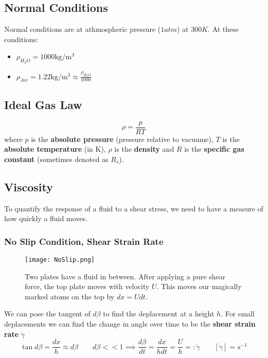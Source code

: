 \subsection{Normal Conditions}
Normal conditions are at athmospheric pressure ($1atm$) at $300K$. At these conditions:
\begin{itemize}
    \item $\rho_{H_2O} = 1000 \mathrm{kg/m^3}$
    \item $\rho_{Air} = 1.22 \mathrm{kg/m^3} \approx \frac{\rho_{H_2O}}{1000}$
\end{itemize}

\subsection{Ideal Gas Law}
$$
\rho = \frac{p}{RT}
$$
where $p$ is the \textbf{absolute pressure} (pressure relative to vacuume), $T$ is the \textbf{absolute temperature} (in $\mathrm{K}$), $\rho$ is the \textbf{density} and $R$ is the \textbf{specific gas constant} (sometimes denoted as $R_s$).

\subsection{Viscosity}
To quantify the response of a fluid to a shear stress, we need to have a measure of how quickly a fluid moves.

\subsubsection{No Slip Condition, Shear Strain Rate}
\begin{center}
\end{center}
\begin{figure}[H]
    \begin{center}
    \texttt{[image: NoSlip.png]}
    \caption{Two plates have a fluid in between. After applying a pure shear force, the top plate moves with velocity $U$. This moves our magically marked atoms on the top by $dx=Udt$.}
    \end{center}
\end{figure}
We can pose the tangent of $d\beta$ to find the deplacement at a height $h$. For small deplacements we can find the change in angle over time to be the \textbf{shear strain rate} $\dot \gamma$
$$
\tan d\beta = \frac {dx}h \approx d\beta \qquad d\beta << 1\implies \frac {d\beta}{dt} = \frac{dx}{hdt}=\frac Uh =: \dot \gamma\qquad [\dot \gamma] = s^{-1}
$$
